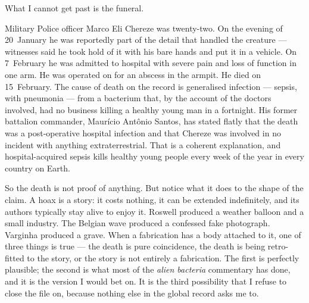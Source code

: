 What I cannot get past is the funeral.


Military Police officer Marco Eli Chereze was twenty-two. On the evening of 20~January he
was reportedly part of the detail that handled the creature --- witnesses said he took hold
of it with his bare hands and put it in a vehicle. On 7~February he was admitted to
hospital with severe pain and loss of function in one arm. He was operated on for an
abscess in the armpit. He died on 15~February. The cause of death on the record is
generalised infection --- sepsis, with pneumonia --- from a bacterium that, by the account of
the doctors involved, had no business killing a healthy young man in a fortnight. His
former battalion commander, Maur\'icio Ant\^onio Santos, has stated flatly that the death was
a post-operative hospital infection and that Chereze was involved in no incident with
anything extraterrestrial. That is a coherent explanation, and hospital-acquired sepsis
kills healthy young people every week of the year in every country on Earth.

So the death is not proof of anything. But notice what it does to the shape of the claim.
A hoax is a story: it costs nothing, it can be extended indefinitely, and its authors
typically stay alive to enjoy it. Roswell produced a weather balloon and a small industry.
The Belgian wave produced a confessed fake photograph. Varginha produced a grave. When a
fabrication has a body attached to it, one of three things is true --- the death is pure
coincidence, the death is being retro-fitted to the story, or the story is not entirely a
fabrication. The first is perfectly plausible; the second is what most of the
\emph{alien bacteria} commentary has done, and it is the version I would bet on. It is the
third possibility that I refuse to close the file on, because nothing else in the global
record asks me to.

